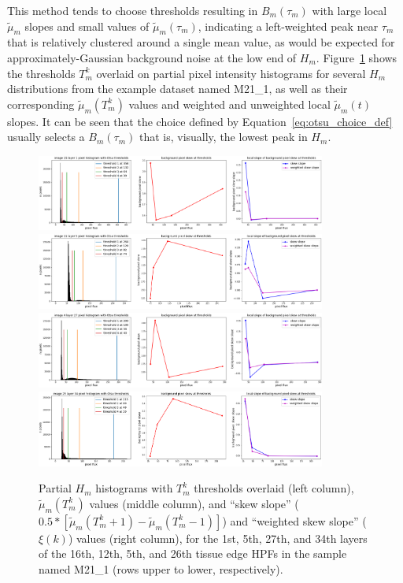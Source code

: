 \documentclass[letterpaper,11pt]{article}
\newcommand{\reffig}[1]{Figure~\ref{#1}}
\newcommand{\refeq}[1]{Equation~\ref{#1}}
\begin{document}
This method tends to choose thresholds resulting in $B_{m}(\tau_{m})$ with large local $\widetilde{\mu}_{m}$ slopes and small values of $\widetilde{\mu}_{m}(\tau_{m})$, indicating a left-weighted peak near $\tau_{m}$ that is relatively clustered around a single mean value, as would be expected for approximately-Gaussian background noise at the low end of $H_{m}$. \reffig{fig:histograms_with_otsu_thresholds} shows the thresholds $T^{k}_{m}$ overlaid on partial pixel intensity histograms for several $H_{m}$ distributions from the example dataset named M21\_1, as well as their corresponding $\widetilde{\mu}_{m}(T^{k}_{m})$ values and weighted and unweighted local $\widetilde{\mu}_{m}(t)$ slopes. It can be seen that the choice defined by \refeq{eq:otsu_choice_def} usually selects a $B_{m}(\tau_{m})$ that is, visually, the lowest peak in $H_{m}$.

\begin{figure}[!ht]
\centering
\includegraphics[width=0.85\textwidth]{images/masking/thresholds_image_15_layer_1}
\includegraphics[width=0.85\textwidth]{images/masking/thresholds_image_11_layer_5}
\includegraphics[width=0.85\textwidth]{images/masking/thresholds_image_4_layer_27}
\includegraphics[width=0.85\textwidth]{images/masking/thresholds_image_25_layer_34}
\caption{\footnotesize Partial $H_{m}$ histograms with $T^{k}_{m}$ thresholds overlaid (left column), $\widetilde{\mu}_{m}(T^{k}_{m})$ values (middle column), and ``skew slope'' ($0.5*\left[\widetilde{\mu}_{m}(T^{k}_{m}+1) - \widetilde{\mu}_{m}(T^{k}_{m}-1)\right]$) and ``weighted skew slope'' ($\xi(k)$) values (right column), for the 1st, 5th, 27th, and 34th layers of the 16th, 12th, 5th, and 26th tissue edge HPFs in the sample named M21\_1 (rows upper to lower, respectively).}
\label{fig:histograms_with_otsu_thresholds}
\end{figure}
\end{document}
